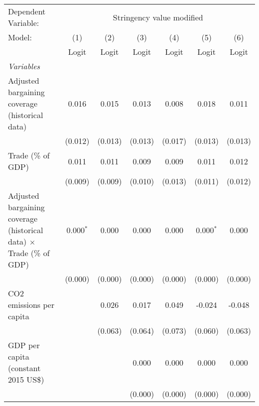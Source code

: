 
\begingroup
\centering
\begin{tabular}{lcccccc}
   \toprule
   Dependent Variable: & \multicolumn{6}{c}{Stringency value modified}\\
   Model:                                                                      & (1)         & (2)     & (3)     & (4)           & (5)          & (6)\\  
                                                                               &  Logit      & Logit   & Logit   & Logit         & Logit        & Logit\\  
   \midrule
   \emph{Variables}\\
   Adjusted bargaining coverage (historical data)                              & 0.016       & 0.015   & 0.013   & 0.008         & 0.018        & 0.011\\   
                                                                               & (0.012)     & (0.013) & (0.013) & (0.017)       & (0.013)      & (0.013)\\   
   Trade (\% of GDP)                                                           & 0.011       & 0.011   & 0.009   & 0.009         & 0.011        & 0.012\\   
                                                                               & (0.009)     & (0.009) & (0.010) & (0.013)       & (0.011)      & (0.012)\\   
   Adjusted bargaining coverage (historical data) $\times$ Trade (\% of GDP)   & 0.000$^{*}$ & 0.000   & 0.000   & 0.000         & 0.000$^{*}$  & 0.000\\   
                                                                               & (0.000)     & (0.000) & (0.000) & (0.000)       & (0.000)      & (0.000)\\   
   CO2 emissions per capita                                                    &             & 0.026   & 0.017   & 0.049         & -0.024       & -0.048\\   
                                                                               &             & (0.063) & (0.064) & (0.073)       & (0.060)      & (0.063)\\   
   GDP per capita (constant 2015 US\$)                                         &             &         & 0.000   & 0.000         & 0.000        & 0.000\\   
                                                                               &             &         & (0.000) & (0.000)       & (0.000)      & (0.000)\\   

\end{tabular}

